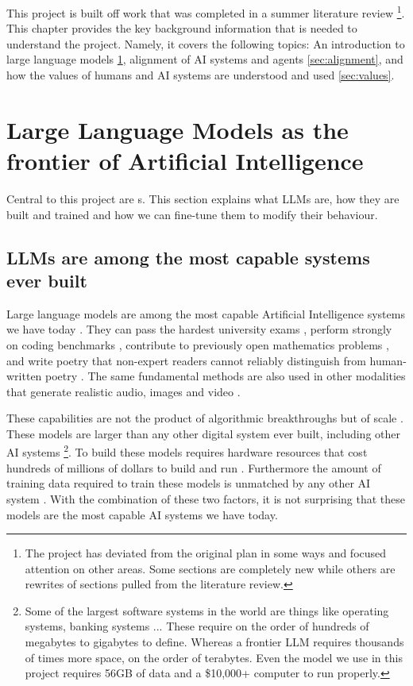 This project is built off work that was completed in a summer literature review \cite{thompsonAligningLargeLanguage2026}\footnote{The project has deviated from the original plan in some ways and focused attention on other areas. Some sections are completely new while others are rewrites of sections pulled from the literature review.}. This chapter provides the key background information that is needed to understand the project. Namely, it covers the following topics: An introduction to large language models \ref{sec:llms}, alignment of AI systems and agents \ref{sec:alignment}, and how the values of humans and AI systems are understood and used \ref{sec:values}.

\section{Large Language Models as the frontier of Artificial Intelligence}
\label{sec:llms}

Central to this project are s. This section explains what LLMs are, how they are built and trained and how we can fine-tune them to modify their behaviour.


\subsection{LLMs are among the most capable systems ever built}

Large language models are among the most capable Artificial Intelligence systems we have today \cite{zhaoSurveyLargeLanguage2025,bommasaniOpportunitiesRisksFoundation2022}. They can pass the hardest university exams \cite{phan2025humanitysexam}, perform strongly on coding benchmarks \cite{chenEvaluatingLargeLanguage2021,jimenezSWEbenchCanLanguage2024}, contribute to previously open mathematics problems \cite{OpenAIModelHas2026}, and write poetry that non-expert readers cannot reliably distinguish from human-written poetry \cite{porterAIgeneratedPoetryIndistinguishable2024}. The same fundamental methods are also used in other modalities that generate realistic audio, images and video \cite{team2023gemini,alayracFlamingoVisualLanguage2022,qwen3.5}.

These capabilities are not the product of algorithmic breakthroughs but of scale \cite{kaplanScalingLawsNeural2020}. These models are larger than any other digital system ever built, including other AI systems \footnote{Some of the largest software systems in the world are things like operating systems, banking systems ... These require on the order of hundreds of megabytes to gigabytes to define. Whereas a frontier LLM requires thousands of times more space, on the order of terabytes. Even the  model we use in this project requires 56GB of data and a \$10,000+ computer to run properly.}. To build these models requires hardware resources that cost hundreds of millions of dollars to build and run \cite{cottierRisingCostsTraining2024,crawfordAtlasAIPower2021}. Furthermore the amount of training data required to train these models is unmatched by any other AI system \cite{CommonCrawl2025}. With the combination of these two factors, it is not surprising that these models are the most capable AI systems we have today.

